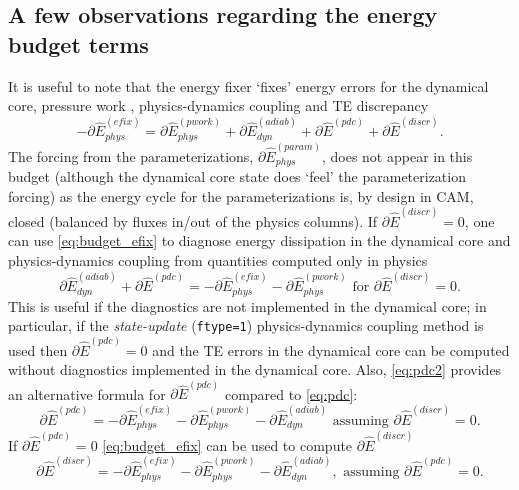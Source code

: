 \documentclass[draft,linenumbers]{agujournal}
\newcommand*{\gi}[1]{\widehat{#1}}
\begin{document}
\subsection{A few observations regarding the energy budget terms}
It is useful to note that the energy fixer `fixes' energy errors for the dynamical core, pressure work {\color{red}{error}}, physics-dynamics coupling and TE discrepancy
\begin{equation}
\label{eq:budget_efix}
-\partial \gi{E}_{phys}^{({efix})}=\partial \gi{E}_{phys}^{({pwork})}+\partial \gi{E}_{dyn}^{({adiab})}+\partial \gi{E}^{({pdc})}+\partial \gi{E}^{({discr})}.
\end{equation}
The forcing from the parameterizations, $\partial \gi{E}_{phys}^{({param})}$, does not appear in this budget (although the dynamical core state does `feel' the parameterization forcing) as the energy cycle for the parameterizations is, by design in CAM, closed (balanced by fluxes in/out of the physics columns). If $\partial \gi{E}^{({discr})}=0$, one can use \eqref{eq:budget_efix} to diagnose energy dissipation in the dynamical core and physics-dynamics coupling from quantities computed only in physics
\begin{equation}
\label{eq:pdc2}
\partial \gi{E}_{dyn}^{({adiab})}+\partial \gi{E}^{({pdc})}=-\partial \gi{E}_{phys}^{({efix})}-\partial \gi{E}_{phys}^{({pwork})} \text{ for  }\partial \gi{E}^{({discr})}=0.
\end{equation}
This is useful if the diagnostics are not implemented in the dynamical core; in particular, if the {\em{state-update}} ({\tt{ftype=1}}) physics-dynamics coupling method is used then $\partial \gi{E}^{({pdc})}=0$ and the TE errors in the dynamical core can be computed without diagnostics implemented in the dynamical core. Also, \eqref{eq:pdc2} provides an alternative formula for $\partial \gi{E}^{({pdc})}$ compared to \eqref{eq:pdc}:
\begin{equation}
\label{eq:pdc3}
\partial \gi{E}^{({pdc})}=-\partial \gi{E}_{phys}^{({efix})}-\partial \gi{E}_{phys}^{({pwork})}-\partial \gi{E}_{dyn}^{({adiab})} \text{ assuming }\partial \gi{E}^{({discr})}=0.
\end{equation}
If $\partial \gi{E}^{({pdc})}=0$ \eqref{eq:budget_efix} can be used to compute $\partial \gi{E}^{({discr})}$
\begin{equation}
\label{eq:discre}
\partial \gi{E}^{(discr)}=-\partial \gi{E}_{phys}^{({efix})}-\partial \gi{E}_{phys}^{({pwork})}-\partial \gi{E}_{dyn}^{({adiab})}, \text{ assuming }\partial \gi{E}^{(pdc)}=0.
\end{equation}
\end{document}

